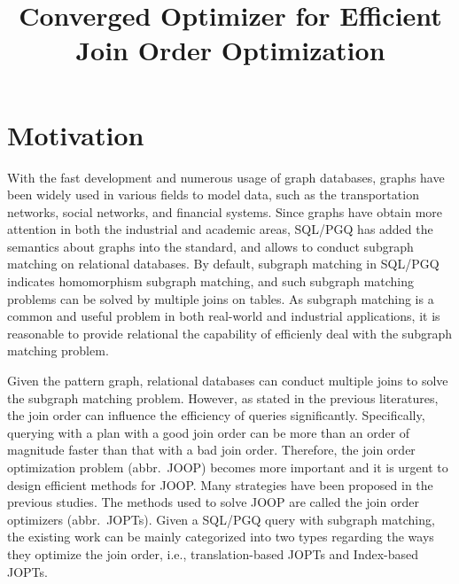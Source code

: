 \documentclass[sigconf, nonacm]{acmart}
\begin{document}
\title{Converged Optimizer for Efficient Join Order Optimization}



\begin{abstract}

\end{abstract}

\maketitle

\section{Motivation}
\label{sec:motivation}
With the fast development and numerous usage of graph databases, graphs have been widely used in various fields to model data, such as the transportation networks, social networks, and financial systems.
Since graphs have obtain more attention in both the industrial and academic areas, SQL/PGQ has added the semantics about graphs into the standard, and allows to conduct subgraph matching on relational databases.
By default, subgraph matching in SQL/PGQ indicates homomorphism subgraph matching, and such subgraph matching problems can be solved by multiple joins on tables.
As subgraph matching is a common and useful problem in both real-world and industrial applications, it is reasonable to provide relational the capability of efficienly deal with the subgraph matching problem.

Given the pattern graph, relational databases can conduct multiple joins to solve the subgraph matching problem.
However, as stated in the previous literatures, the join order can influence the efficiency of queries significantly.
Specifically, querying with a plan with a good join order can be more than an order of magnitude faster than that with a bad join order.
Therefore, the join order optimization problem (abbr.~JOOP) becomes more important and it is urgent to design efficient methods for JOOP.
Many strategies have been proposed in the previous studies. 
The methods used to solve JOOP are called the join order optimizers (abbr.~JOPTs).
Given a SQL/PGQ query with subgraph matching, the existing work can be mainly categorized into two types regarding the ways they optimize the join order, i.e., translation-based JOPTs and Index-based JOPTs.
\end{document}
